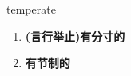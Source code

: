
\begin{frame}
{\huge temperate}
\begin{center}
\begin{enumerate}\Large
  \item \textbf{(言行举止)有分寸的}
  \item \textbf{有节制的}
\end{enumerate}
\end{center}
\end{frame}
